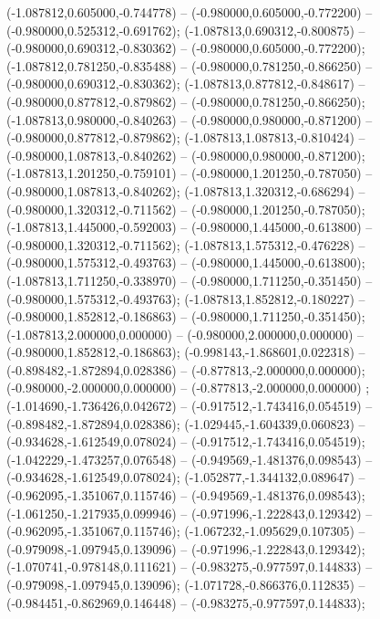  (-1.087812,0.605000,-0.744778) -- (-0.980000,0.605000,-0.772200) -- (-0.980000,0.525312,-0.691762);
 (-1.087813,0.690312,-0.800875) -- (-0.980000,0.690312,-0.830362) -- (-0.980000,0.605000,-0.772200);
 (-1.087812,0.781250,-0.835488) -- (-0.980000,0.781250,-0.866250) -- (-0.980000,0.690312,-0.830362);
 (-1.087813,0.877812,-0.848617) -- (-0.980000,0.877812,-0.879862) -- (-0.980000,0.781250,-0.866250);
 (-1.087813,0.980000,-0.840263) -- (-0.980000,0.980000,-0.871200) -- (-0.980000,0.877812,-0.879862);
 (-1.087813,1.087813,-0.810424) -- (-0.980000,1.087813,-0.840262) -- (-0.980000,0.980000,-0.871200);
 (-1.087813,1.201250,-0.759101) -- (-0.980000,1.201250,-0.787050) -- (-0.980000,1.087813,-0.840262);
 (-1.087813,1.320312,-0.686294) -- (-0.980000,1.320312,-0.711562) -- (-0.980000,1.201250,-0.787050);
 (-1.087813,1.445000,-0.592003) -- (-0.980000,1.445000,-0.613800) -- (-0.980000,1.320312,-0.711562);
 (-1.087813,1.575312,-0.476228) -- (-0.980000,1.575312,-0.493763) -- (-0.980000,1.445000,-0.613800);
 (-1.087813,1.711250,-0.338970) -- (-0.980000,1.711250,-0.351450) -- (-0.980000,1.575312,-0.493763);
 (-1.087813,1.852812,-0.180227) -- (-0.980000,1.852812,-0.186863) -- (-0.980000,1.711250,-0.351450);
 (-1.087813,2.000000,0.000000) -- (-0.980000,2.000000,0.000000) -- (-0.980000,1.852812,-0.186863);
 (-0.998143,-1.868601,0.022318) -- (-0.898482,-1.872894,0.028386) -- (-0.877813,-2.000000,0.000000);
 (-0.980000,-2.000000,0.000000) -- (-0.877813,-2.000000,0.000000) ;
 (-1.014690,-1.736426,0.042672) -- (-0.917512,-1.743416,0.054519) -- (-0.898482,-1.872894,0.028386);
 (-1.029445,-1.604339,0.060823) -- (-0.934628,-1.612549,0.078024) -- (-0.917512,-1.743416,0.054519);
 (-1.042229,-1.473257,0.076548) -- (-0.949569,-1.481376,0.098543) -- (-0.934628,-1.612549,0.078024);
 (-1.052877,-1.344132,0.089647) -- (-0.962095,-1.351067,0.115746) -- (-0.949569,-1.481376,0.098543);
 (-1.061250,-1.217935,0.099946) -- (-0.971996,-1.222843,0.129342) -- (-0.962095,-1.351067,0.115746);
 (-1.067232,-1.095629,0.107305) -- (-0.979098,-1.097945,0.139096) -- (-0.971996,-1.222843,0.129342);
 (-1.070741,-0.978148,0.111621) -- (-0.983275,-0.977597,0.144833) -- (-0.979098,-1.097945,0.139096);
 (-1.071728,-0.866376,0.112835) -- (-0.984451,-0.862969,0.146448) -- (-0.983275,-0.977597,0.144833);
